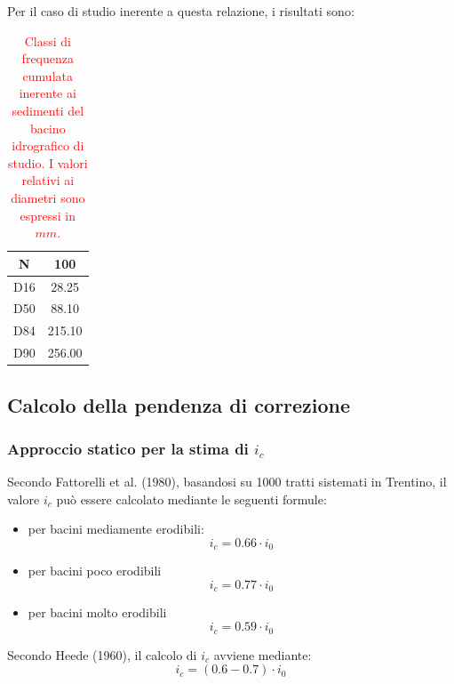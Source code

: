 Per il caso di studio inerente a questa relazione, i risultati sono:
\begin{table}[H]\centering
    \caption{\textcolor{red}{Classi di frequenza cumulata inerente ai sedimenti del bacino idrografico di studio. I valori relativi ai diametri sono espressi in $mm$.}}
    \begin{tabular}{cc}
    \toprule
    N   & 100      \\
    \midrule
    D16 & 28.25    \\
    D50 & 88.10    \\
    D84 & 215.10   \\
    D90 & 256.00   \\
    \bottomrule
    \end{tabular}
    \end{table}

\subsection{Calcolo della pendenza di correzione}
\subsubsection{Approccio statico per la stima di $i_c$}
Secondo Fattorelli et al. (1980), basandosi su 1000 tratti sistemati in Trentino, il valore $i_c$ può essere calcolato mediante le seguenti formule:
\begin{itemize}
    \item per bacini mediamente erodibili:
\begin{equation}
    i_c = 0.66 \cdot i_0 
\end{equation}
\item per bacini poco erodibili
\begin{equation}
    i_c = 0.77 \cdot i_0 
\end{equation}
\item per bacini molto erodibili
\begin{equation}
    i_c = 0.59 \cdot i_0 
\end{equation}
\end{itemize}
 
Secondo Heede (1960), il calcolo di $i_c$ avviene mediante:
\begin{equation}
    i_c = (0.6 - 0.7) \cdot i_0
\end{equation}
